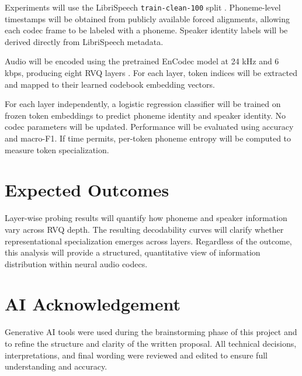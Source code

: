 \documentclass[11pt]{article}
\begin{document}
Experiments will use the LibriSpeech \texttt{train-clean-100} split \citep{panayotov2015librispeech}. Phoneme-level timestamps will be obtained from publicly available forced alignments, allowing each codec frame to be labeled with a phoneme. Speaker identity labels will be derived directly from LibriSpeech metadata.

Audio will be encoded using the pretrained EnCodec model at 24 kHz and 6 kbps, producing eight RVQ layers \citep{defossez2022highfidelity}. For each layer, token indices will be extracted and mapped to their learned codebook embedding vectors.

For each layer independently, a logistic regression classifier will be trained on frozen token embeddings to predict phoneme identity and speaker identity. No codec parameters will be updated. Performance will be evaluated using accuracy and macro-F1. If time permits, per-token phoneme entropy will be computed to measure token specialization.

\section*{Expected Outcomes}

Layer-wise probing results will quantify how phoneme and speaker information vary across RVQ depth. The resulting decodability curves will clarify whether representational specialization emerges across layers. Regardless of the outcome, this analysis will provide a structured, quantitative view of information distribution within neural audio codecs.

\section*{AI Acknowledgement}

Generative AI tools were used during the brainstorming phase of this project and to refine the structure and clarity of the written proposal. All technical decisions, interpretations, and final wording were reviewed and edited to ensure full understanding and accuracy.
\end{document}
